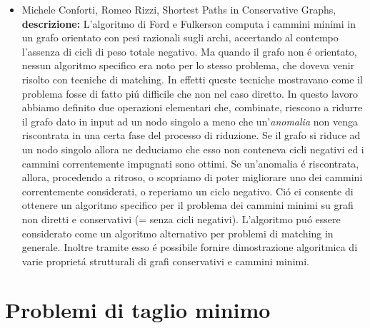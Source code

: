 \documentclass[10pt]{article}
\begin{document}
\begin{itemize}
  \vspace{1.4mm}
  \item[] {\sc Michele Conforti, Romeo Rizzi},  
   \newblock  Shortest Paths in Conservative Graphs,
   \\
{\bf descrizione:}
L'algoritmo di Ford e Fulkerson
computa i cammini minimi in un grafo orientato
con pesi razionali sugli archi,
accertando al contempo l'assenza di cicli di peso totale
negativo.
Ma quando il grafo non \'e orientato,
nessun algoritmo specifico era noto per lo stesso problema,
che doveva venir risolto con tecniche di matching.
In effetti queste tecniche mostravano come
il problema fosse di fatto pi\'u difficile che non nel caso diretto.
In questo lavoro abbiamo definito due operazioni elementari
che, combinate, riescono a ridurre il grafo dato in input
ad un nodo singolo
a meno che un'{\em anomalia} non venga riscontrata
in una certa fase del processo di riduzione.
Se il grafo si riduce ad un nodo singolo
allora ne deduciamo che esso non conteneva
cicli negativi ed i cammini correntemente impugnati sono ottimi.
Se un'anomalia \'e riscontrata,
allora, procedendo a ritroso,
o scopriamo di poter migliorare uno dei cammini correntemente considerati,
o reperiamo un ciclo negativo.
Ci\'o ci consente di ottenere
un algoritmo specifico
per il problema dei cammini minimi su grafi non diretti
e conservativi (= senza cicli negativi).
L'algoritmo pu\'o essere
considerato come un algoritmo alternativo
per problemi di matching in generale.
Inoltre tramite esso \'e possibile
fornire dimostrazione algoritmica
di varie propriet\'a strutturali
di grafi conservativi e cammini minimi.\\ 
\end{itemize}



\section{Problemi di taglio minimo}
\end{document}
